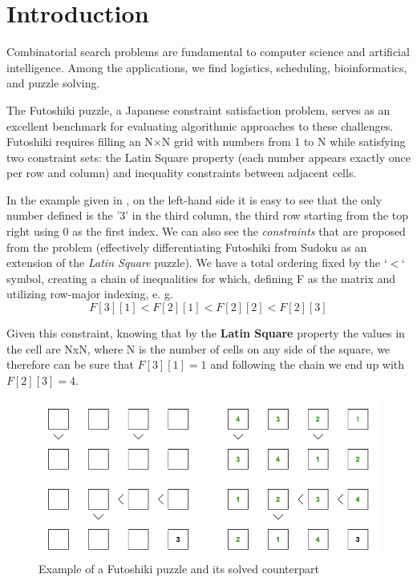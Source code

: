 \section{Introduction}
\label{sec:intro}
Combinatorial search problems are fundamental to computer science and artificial intelligence. Among the applications, we find logistics, scheduling, bioinformatics, and puzzle solving. 

The Futoshiki puzzle, a Japanese constraint satisfaction problem, serves as an excellent benchmark for evaluating algorithmic approaches to these challenges. Futoshiki requires filling an N×N grid with numbers from 1 to N while satisfying two constraint sets: the Latin Square property (each number appears exactly once per row and column) and inequality constraints between adjacent cells.

In the example given in , on the left-hand side it is easy to see that the only number defined is the '3' in the third column, the third row starting from the top right using 0 as the first index. We can also see the \textit{constraints} that are proposed from the problem (effectively differentiating Futoshiki from Sudoku as an extension of the \textit{Latin Square} puzzle). We have a total ordering fixed by the $`<`$ symbol, creating a chain of inequalities for which, defining F as the matrix and utilizing row-major indexing, e. g.
\[
\label{futoshiki_inequalities}
    F[3][1] < F[2][1] < F[2][2] < F[2][3] 
\]

Given this constraint, knowing that by the \textbf{Latin Square} property the values in the cell are NxN, where N is the number of cells on any side of the square, we therefore can be sure that $F[3][1] = 1$ and following the chain we end up with $F[2][3] = 4$.

\begin{figure}[H]
\centering
\includegraphics[scale=0.6]{imgs/futoshiki_example.png}
\caption{Example of a Futoshiki puzzle and its solved counterpart \cite{Sen2024Futoshiki}}
    \label{fig:futoshiki_example}
\end{figure}


